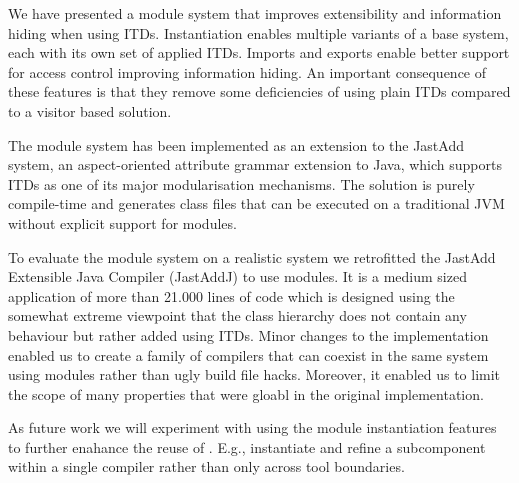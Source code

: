 We have presented a module system that improves extensibility and
information hiding when using ITDs. Instantiation enables multiple
variants of a base system, each with its own set of applied ITDs. Imports
and exports enable better support for access control improving information
hiding. An important consequence of these features is that they remove some
deficiencies of using plain ITDs compared to a visitor based solution.

The module system has been implemented as an extension to the JastAdd
system, an aspect-oriented attribute grammar extension to Java, which
supports ITDs as one of its major modularisation mechanisms. The solution
is purely compile-time and generates class files that can be executed on
a traditional JVM without explicit support for modules.

To evaluate the module system on a realistic system we retrofitted the
JastAdd Extensible Java Compiler (JastAddJ) to use modules. It is a
medium sized application of more than 21.000 lines of code which is
designed using the somewhat extreme viewpoint that the class hierarchy does
not contain any behaviour but rather added using ITDs. Minor changes to the
implementation enabled us to create a family of compilers that can coexist in the
same system using modules rather than ugly build file hacks. Moreover, it
enabled us to limit the scope of many properties that were gloabl in the
original implementation.

As future work we will experiment with using the module instantiation
features to further enahance the reuse of . E.g., instantiate and refine a
subcomponent within a single compiler rather than only across tool
boundaries. 
